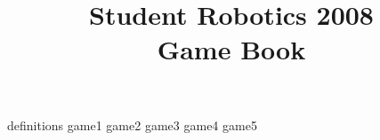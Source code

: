 \documentclass[a4paper, 12pt]{article}
\begin{document}
\title {Student Robotics 2008\\Game Book}

\maketitle

\tableofcontents
 {definitions}
 {game1}
 {game2}
 {game3}
 {game4}
 {game5}
\end{document}
